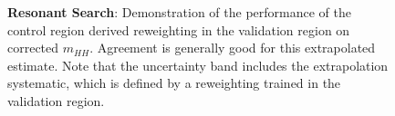 \begin{figure}[ht]
  \centering
  \caption{\label{fig:res-vr-mhh} \textbf{Resonant Search}: Demonstration of the performance 
  of the control region derived reweighting in the validation region on corrected $m_{HH}$. Agreement 
  is generally good for this extrapolated estimate. Note that the uncertainty band includes the 
  extrapolation systematic, which is defined by a reweighting trained in the validation region.}
\end{figure}

